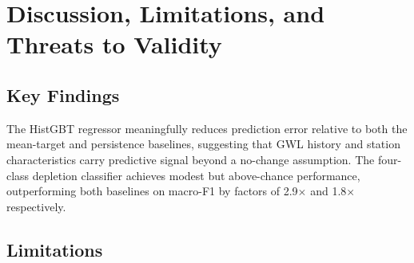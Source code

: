 \documentclass[conference]{IEEEtran}
\begin{document}
\section{Discussion, Limitations, and Threats to Validity}
\label{sec:discussion}

\subsection{Key Findings}

The HistGBT regressor meaningfully reduces prediction error relative
to both the mean-target and persistence baselines, suggesting that
GWL history and station characteristics carry predictive signal
beyond a no-change assumption.
The four-class depletion classifier achieves modest but above-chance
performance, outperforming both baselines on macro-F1 by factors of
2.9$\times$ and 1.8$\times$ respectively.

\subsection{Limitations}
\end{document}
